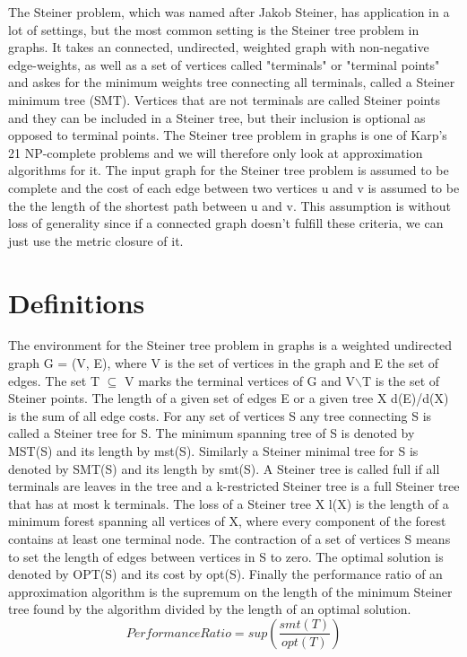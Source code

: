 The Steiner problem, which was named after Jakob Steiner, has application in a lot of settings, but the most common setting is the Steiner tree problem in graphs. It takes an connected, undirected, weighted graph with non-negative edge-weights, as well as a set of vertices called "terminals" or "terminal points" and askes for the minimum weights tree connecting all terminals, called a Steiner minimum tree (SMT). Vertices that are not terminals are called Steiner points and they can be included in a Steiner tree, but their inclusion is optional as opposed to terminal points. The Steiner tree problem in graphs is one of Karp's 21 NP-complete problems \cite{karp1972reducibility} and we will therefore only look at approximation algorithms for it. The input graph for the Steiner tree problem is assumed to be complete and the cost of each edge between two vertices u and v is assumed to be the the length of the shortest path between u and v. This assumption is without loss of generality since if a connected graph doesn't fulfill these criteria, we can just use the metric closure of it.

\section{Definitions}
The environment for the Steiner tree problem in graphs is a weighted undirected graph G = (V, E), where V is the set of vertices in the graph and E the set of edges. The set T $ \subseteq$ V marks the terminal vertices of G and V$\backslash$T is the set of Steiner points. The length of a given set of edges E or a given tree X d(E)/d(X) is the sum of all edge costs. For any set of vertices S any tree connecting S is called a Steiner tree for S. The minimum spanning tree of S is denoted by MST(S) and its length by mst(S). Similarly a Steiner minimal tree for S is denoted by SMT(S) and its length by smt(S). A Steiner tree is called full if all terminals are leaves in the tree and a k-restricted Steiner tree is a full Steiner tree that has at most k terminals. The loss of a Steiner tree X l(X) is the length of a minimum forest spanning all vertices of X, where every component of the forest contains at least one terminal node. The contraction of a set of vertices S means to set the length of edges between vertices in S to zero. The optimal solution is denoted by OPT(S) and its cost by opt(S). Finally the performance ratio of an approximation algorithm is the supremum on the length of the minimum Steiner tree found by the algorithm divided by the length of an optimal solution.
\begin{equation} 
  Performance Ratio=sup(\frac{smt(T)}{opt(T)})
\end{equation}

